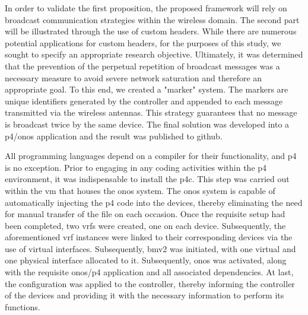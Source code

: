 In order to validate the first proposition, the proposed framework will rely on broadcast communication strategies within the wireless domain. The second part will be illustrated through the use of custom headers. While there are numerous potential applications for custom headers, for the purposes of this study, we sought to specify an appropriate research objective. Ultimately, it was determined that the prevention of the perpetual repetition of broadcast messages was a necessary measure to avoid severe network saturation and therefore an appropriate goal. 
To this end, we created a "marker" system. The markers are unique identifiers generated by the controller and appended to each message transmitted via the wireless antennas. This strategy guarantees that no message is broadcast twice by the same device. The final solution was developed into a \gls{p4}/\gls{onos} application and the result was published to github\cite{noauthor_baco-66onos-apps_nodate}.

All programming languages depend on a compiler for their functionality, and \gls{p4} is no exception. Prior to engaging in any coding activities within the \gls{p4} environment, it was indispensable to install the p4c\cite{noauthor_p4langp4c_nodate}. This step was carried out within the \gls{vm} that houses the \gls{onos} system. The \gls{onos} system is capable of automatically injecting the \gls{p4} code into the devices, thereby eliminating the need for manual transfer of the file on each occasion.
Once the requisite setup had been completed, two \glspl{vrf} were created, one on each device. Subsequently, the aforementioned \gls{vrf} instances were linked to their corresponding devices via the use of virtual interfaces. Subsequently, \gls{bmv2} was initiated, with one virtual and one physical interface allocated to it. Subsequently, \gls{onos} was activated, along with the requisite \gls{onos}/\gls{p4} application and all associated dependencies. At last, the configuration was applied to the controller, thereby informing the controller of the devices and providing it with the necessary information to perform its functions.

